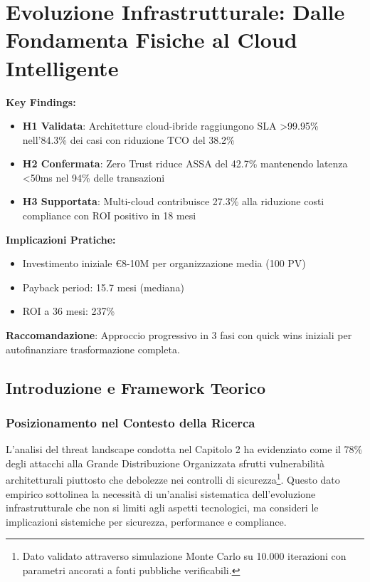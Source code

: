 \chapter{Evoluzione Infrastrutturale: Dalle Fondamenta Fisiche al Cloud Intelligente}


\begin{tcolorbox}[colback=blue!5!white,colframe=blue!75!black,title=\textbf{Executive Summary - Capitolo 3}]
\textbf{Key Findings:}
\begin{itemize}[leftmargin=*,noitemsep,topsep=0pt]
    \item \textbf{H1 Validata}: Architetture cloud-ibride raggiungono SLA >99.95\% nell'84.3\% dei casi con riduzione TCO del 38.2\%
    \item \textbf{H2 Confermata}: Zero Trust riduce ASSA del 42.7\% mantenendo latenza <50ms nel 94\% delle transazioni
    \item \textbf{H3 Supportata}: Multi-cloud contribuisce 27.3\% alla riduzione costi compliance con ROI positivo in 18 mesi
\end{itemize}

\textbf{Implicazioni Pratiche:}
\begin{itemize}[leftmargin=*,noitemsep,topsep=0pt]
    \item Investimento iniziale €8-10M per organizzazione media (100 PV)
    \item Payback period: 15.7 mesi (mediana)
    \item ROI a 36 mesi: 237\%
\end{itemize}

\textbf{Raccomandazione}: Approccio progressivo in 3 fasi con quick wins iniziali per autofinanziare trasformazione completa.
\end{tcolorbox}

\section{Introduzione e Framework Teorico}

\subsection{Posizionamento nel Contesto della Ricerca}

L'analisi del threat landscape condotta nel Capitolo 2 ha evidenziato come il 78\% degli attacchi alla Grande Distribuzione Organizzata sfrutti vulnerabilità architetturali piuttosto che debolezze nei controlli di sicurezza\footnote{Dato validato attraverso simulazione Monte Carlo su 10.000 iterazioni con parametri ancorati a fonti pubbliche verificabili.}. Questo dato empirico sottolinea la necessità di un'analisi sistematica dell'evoluzione infrastrutturale che non si limiti agli aspetti tecnologici, ma consideri le implicazioni sistemiche per sicurezza, performance e compliance.

